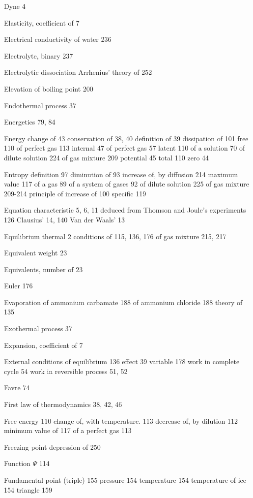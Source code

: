 \documentclass[12pt]{book}[2005/09/16]
\newcommand{\PageSep}[1]{\ignorespaces}
\begin{document}
Dyne 4



Elasticity, coefficient of 7

Electrical conductivity of water 236

Electrolyte, binary 237

Electrolytic dissociation
  Arrhenius' theory of 252

Elevation of boiling point 200

Endothermal process 37

Energetics 79, 84

Energy
  change of 43
  conservation of 38, 40
  definition of 39
  dissipation of 101
  free 110
    of perfect gas 113
  internal 47
    of perfect gas 57
  latent 110
  of a solution 70
  of dilute solution 224
  of gas mixture 209
  potential 45
  total 110
  zero 44

Entropy
  definition 97
  diminution of 93
  increase of, by diffusion 214
  maximum value 117
  of a gas 89
  of a system of gases 92
  of dilute solution 225
  of gas mixture 209-214
  principle of increase of 100
  specific 119

Equation
  characteristic 5, 6, 11
  deduced from Thomson and Joule's experiments 126
  Clausius' 14, 140
  Van der Waals' 13

Equilibrium
  thermal 2
  conditions of 115, 136, 176
  of gas mixture 215, 217

Equivalent weight 23

Equivalents, number of 23

Euler 176

Evaporation
  of ammonium carbamate 188
  of ammonium chloride 188
  theory of 135

Exothermal process 37

Expansion, coefficient of 7

External conditions of equilibrium 136
  effect 39
  variable 178
  work in complete cycle 54
  work in reversible process 51, 52



Favre 74

First law of thermodynamics 38, 42, 46

Free energy 110
  change of, with temperature. 113
  decrease of, by dilution 112
  minimum value of 117
  of a perfect gas 113

Freezing point
  depression of 250

Function $\Psi$ 114

Fundamental point (triple) 155
  pressure 154
  temperature 154
  temperature of ice 154
  triangle 159
\end{document}
